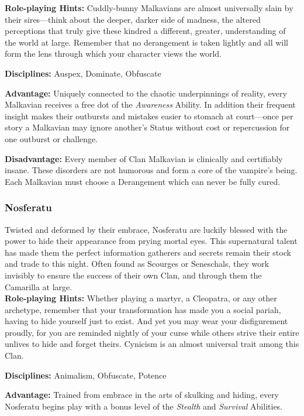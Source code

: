 \textbf{Role-playing Hints:} Cuddly-bunny Malkavians are almost universally slain 
by their sires---think about the deeper, darker side of madness, the altered 
perceptions that truly give these kindred a different, greater, understanding of 
the world at large.  Remember that no derangement is taken lightly and all will 
form the lens through which your character views the world.

\textbf{Disciplines:}  Auspex, Dominate, Obfuscate

\textbf{Advantage:}  Uniquely connected to the chaotic underpinnings of reality, 
every Malkavian receives a free dot of the \emph{Awareness} Ability.  In addition 
their frequent insight makes their outbursts and mistakes easier to stomach at 
court---once per story a Malkavian may ignore another's Status without cost or 
repercussion for one outburst or challenge.

\textbf{Disadvantage:}  Every member of Clan Malkavian is clinically and 
certifiably insane.  These disorders are not humorous and form a core of the 
vampire's being.  Each Malkavian must choose a Derangement which can never be 
fully cured.

\subsubsection{Nosferatu}
Twisted and deformed by their embrace, Nosferatu are luckily blessed with the 
power to hide their appearance from prying mortal eyes.  This supernatural 
talent has made them the perfect information gatherers and secrets remain their 
stock and trade to this night.  Often found as Scourges or Seneschals, they 
work invisibly to ensure the success of their own Clan, and through them the 
Camarilla at large. \\

\textbf{Role-playing Hints:}  Whether playing a martyr, a Cleopatra, or any 
other archetype, remember that your transformation has made you a social 
pariah, having to hide yourself just to exist.  And yet you may wear your 
disfigurement proudly, for you are reminded nightly of your curse while others 
strive their entire unlives to hide and forget theirs.  Cynicism is an almost 
universal trait among this Clan.

\textbf{Disciplines:}  Animalism, Obfuscate, Potence

\textbf{Advantage:}  Trained from embrace in the arts of skulking and hiding, 
every Nosferatu begins play with a bonus level of the \emph{Stealth} and 
\emph{Survival} Abilities.

